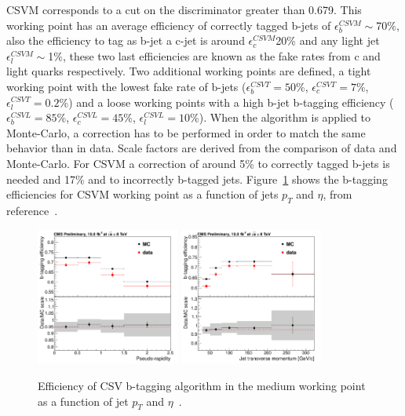 CSVM corresponds to a cut on the discriminator greater than 0.679. This working point has an average efficiency of correctly tagged b-jets of $\epsilon^{CSVM}_{b}\sim$70\%, also the efficiency to tag as b-jet a c-jet is around $\epsilon^{CSVM}_{c}$20\% and any light jet $\epsilon^{CSVM}_{l}\sim$1\%, these two last efficiencies are known as the fake rates from c and light quarks respectively. Two additional working points are defined, a tight working point with the lowest fake rate of b-jets ($\epsilon^{CSVT}_{b}=50$\%, $\epsilon^{CSVT}_{c}=7$\%, $\epsilon^{CSVT}_{l}=0.2$\%) and a loose working points with a high b-jet b-tagging efficiency ($\epsilon^{CSVL}_{b}=85$\%, $\epsilon^{CSVL}_{c}=45$\%, $\epsilon^{CSVL}_{l}=10$\%). When the algorithm is applied to Monte-Carlo, a correction has to be performed in order to match the same behavior than in data. Scale factors are derived from the comparison of data and Monte-Carlo. For CSVM a correction of around 5\% to correctly tagged b-jets is needed and 17\% and to incorrectly b-tagged jets. Figure~\ref{fig:CSVEff} shows the b-tagging efficiencies for CSVM working point as a function of jets $p_{T}$ and $\eta$, from reference~\cite{CMS-PAS-BTV-13-001}.  

\begin{figure}[!Hhtbp]
  \begin{center}
    \includegraphics[width=0.42\textwidth]{figs/LTdilep_csvMeffeta.png}
    \includegraphics[width=0.42\textwidth]{figs/LTdilep_csvMeffpt.png}
    \caption{Efficiency of CSV b-tagging algorithm in the medium working point as a function of jet $p_{T}$ and $\eta$~\cite{CMS-PAS-BTV-13-001}.}
    \label{fig:CSVEff}
  \end{center}
\end{figure}

